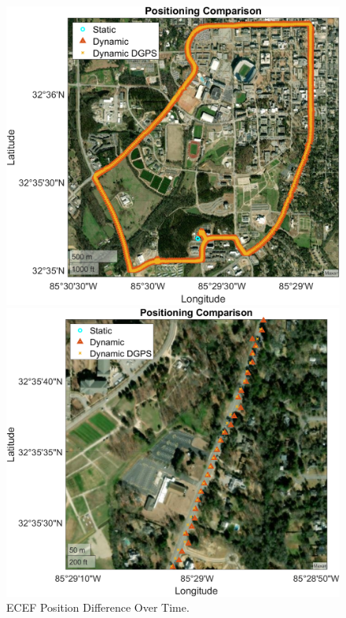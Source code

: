\documentclass[11pt]{article}
\begin{document}
\begin{enumerate}[label=\textbf{\arabic*.}]
\begin{figure}[H]
\begin{minipage}[b]{0.49\textwidth}
          \includegraphics[width=\textwidth]{p4_comp.png}
        \end{minipage}
        \begin{minipage}[b]{0.49\textwidth}
          \includegraphics[width=\textwidth]{p4_comp2.png}
        \end{minipage}
        \caption{ECEF Position Difference Over Time.}
      \end{figure}
      \begin{figure}[H]

\end{figure}
\end{enumerate}
\end{document}
